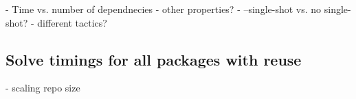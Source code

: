 



- Time vs. number of dependnecies
- other properties?
- --single-shot vs. no single-shot?
- different tactics?

\subsection{Solve timings for all packages with reuse}
- scaling repo size






